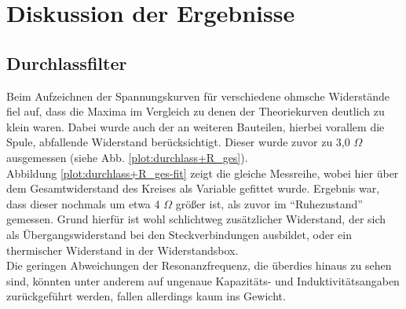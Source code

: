\section{Diskussion der Ergebnisse}

\subsection{Durchlassfilter}
Beim Aufzeichnen der Spannungskurven für verschiedene ohmsche Widerstände fiel auf, dass die Maxima im Vergleich zu denen der Theoriekurven deutlich zu klein waren. Dabei wurde auch der an weiteren Bauteilen, hierbei vorallem die Spule, abfallende Widerstand berücksichtigt. Dieser wurde zuvor zu 3,0 $  \Omega $ ausgemessen (siehe Abb. \ref{plot:durchlass+R_ges}).\\
Abbildung \ref{plot:durchlass+R_ges-fit} zeigt die gleiche Messreihe, wobei hier über dem Gesamtwiderstand des Kreises als Variable gefittet wurde. Ergebnis war, dass dieser nochmals um etwa 4 $  \Omega $ größer ist, als zuvor im \enquote{Ruhezustand} gemessen. Grund hierfür ist wohl schlichtweg zusätzlicher Widerstand, der sich als Übergangswiderstand bei den Steckverbindungen ausbildet, oder ein thermischer Widerstand in der Widerstandsbox.\\
Die geringen Abweichungen der Resonanzfrequenz, die überdies hinaus zu sehen sind, könnten unter anderem auf ungenaue Kapazitäts- und Induktivitätsangaben zurückgeführt werden, fallen allerdings kaum ins Gewicht.
